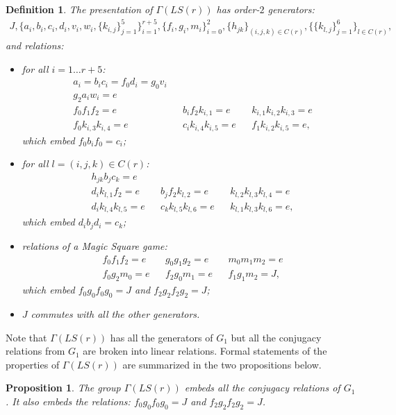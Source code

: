 \documentclass[11pt,letterpaper]{article}
\newcommand{\1}{\mathbb{1}}
\newcommand{\LS}{LS}
\newtheorem{proposition}[theorem]{Proposition}
\newtheorem{definition}[theorem]{Definition}
\theoremstyle{definition}
\begin{document}
\begin{definition}
\label{def:gamma}
The presentation of $\Gamma(\LS(r))$ has order-$2$ generators:
\begin{align*}
	J, \{a_i, b_i, c_i, d_i, v_i,w_i,\{ k_{i,j} \}_{j=1}^5\}_{i=1}^{r+5}, \{f_i,g_i,m_i\}_{i=0}^2, \{h_{jk}\}_{(i,j,k) \in C(r)}, 
	\{\{ k_{l,j} \}_{j=1}^6\}_{l \in C(r)},
\end{align*}
and relations:
\begin{itemize}
\item for all $i = 1 \dots r+5$:
\begin{align*}
	&a_i = b_ic_i = f_0d_i = g_0v_i \\
	&g_2 a_i w_i = e \\
	&f_0 f_1 f_2 = e && b_i f_2 k_{i,1} = e && k_{i,1} k_{i,2} k_{i,3} = e\\
	&f_0 k_{i,3} k_{i,4} = e && c_i k_{i,4} k_{i,5} =e && f_1 k_{i,2} k_{i,5} = e,
\end{align*}
which embed $f_0 b_i f_0 = c_i$;
\item for all $ l = (i,j,k) \in C(r)$:
\begin{align*}
	&h_{jk}b_j c_k = e\\
	&d_i k_{l,1} f_2 = e && b_j f_2 k_{l,2} = e && k_{l,2} k_{l,3} k_{l,4} = e\\
	&d_i k_{l,4} k_{l,5} = e && c_k k_{l,5} k_{l,6} =e && k_{l,1} k_{l,3} k_{l,6} = e,
\end{align*}
which embed $d_i b_j d_i = c_k$;
\item relations of a Magic Square game:
\begin{align*}
	&f_0 f_1 f_2 = e && g_0 g_1 g_2 = e &&m_0 m_1 m_2 = e \\
	&f_0 g_2 m_0 = e && f_2 g_0 m_1 = e && f_1 g_1 m_2 = J,
\end{align*}
which embed $f_0 g_0 f_0 g_0 = J$ and $f_2 g_2 f_2 g_2 = J$;
\item $J$ commutes with all the other generators.
\end{itemize}
\end{definition}
Note that $\Gamma(\LS(r))$ has all the generators of $G_1$ but all the conjugacy relations 
from $G_1$ are broken into linear relations.
Formal statements of the properties of $\Gamma(\LS(r))$ are summarized in the two propositions below.
\begin{proposition}
	The group $\Gamma(\LS(r))$ embeds all the conjugacy relations of $G_1$.
	It also embeds the relations: $f_0 g_0 f_0 g_0 = J$ and $f_2 g_2 f_2 g_2 = J$.
\end{proposition}
\end{document}
